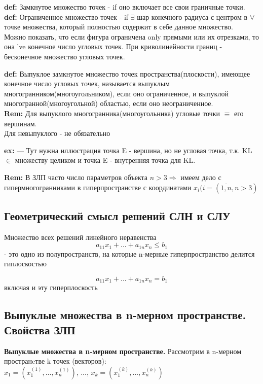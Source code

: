 \textbf{def:} Замкнутое множество точек - if оно включает все свои граничные точки. \\

\textbf{def:} Ограниченное множество точек - if $\exists$ шар конечного радиуса с центром в $\forall$ точке множества, который полностью содержит в себе данное множество.  \\

Можно показать, что если фигура ограничена only прямыми или их отрезками, то она 've конечное число угловых точек. При криволинейности границ - бесконечное множество угловых точек.

\textbf{def:} Выпуклое замкнутое множество точек пространства(плоскости), имеющее конечное число угловых точек, называется выпуклым многогранником(многоугольником), если оно ограниченное, и выпуклой многогранной(многоугольной) областью, если оно неограниченное. \\



\textbf{Rem:} Для выпуклого многогранника(многоугольника) угловые точки $\equiv$ его вершинам. \\
Для невыпуклого - не обязательно

\textbf{ex:} --- Тут нужна иллюстрация точка E - вершина, но не угловая точка, т.к. KL $\in$ множеству целиком и точка E - внутренняя точка для KL.

\textbf{Rem:} В ЗЛП часто число параметров объекта $n > 3 \Rightarrow$ имеем дело с гипермногогранниками в гиперпространстве с координатами $x_i (i = (\overline{1,n}, n > 3)$

\subsection{Геометрический смысл решений СЛН и СЛУ}

\begin{theorem}
Множество всех решений линейного неравенства 
    \begin{equation*}
    a_{11} x_1 + ... + a_{1n}x_n \leq b_1
    \end{equation*} - это одно из полупространств, на которые n-мерные гиперпространство делится гиплоскостью
    
    \begin{equation*}
    a_{11} x_1 + ... + a_{1n}x_n = b_1
    \end{equation*} включая и эту гиперплоскость   
\end{theorem}

\subsection{Выпуклые множества в n-мерном пространстве. Свойства ЗЛП}
\textbf{Выпуклые множества в n-мерном пространстве.}
Рассмотрим в n-мерном пространcтве k точек (векторов): \\
$x_1 = (x_1^{(1)},...,x_n^{(1)})$, ..., $x_k = (x_1^{(k)},...,x_n^{(k)})$

